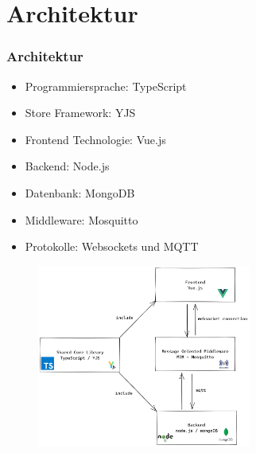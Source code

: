 \section{Architektur}
\begin{frame}
    \frametitle{Architektur}
    \begin{minipage}{0.48\textwidth}
        \begin{itemize}
            \item Programmiersprache: TypeScript
            \item Store Framework: YJS
            \item Frontend Technologie: Vue.js
            \item Backend: Node.js
            \item Datenbank: MongoDB
            \item Middleware: Mosquitto
            \item Protokolle: Websockets und MQTT
        \end{itemize}
    \end{minipage}%
    \hfill
    \begin{minipage}{0.45\textwidth}
        \begin{figure}
            \centering
            \includegraphics[height=6cm]{media/wodss_architecture.png}
        \end{figure}
    \end{minipage}%
\end{frame}
